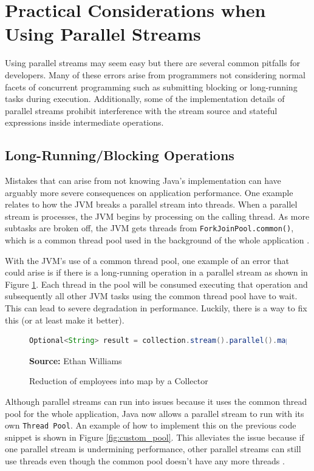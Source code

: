 \documentclass[oneside, 12pt]{article}
\newcommand{\source}[1]{\textbf{Source:} {#1} }
\begin{document}
\section{Practical Considerations when Using Parallel Streams}
Using parallel streams may seem easy but there are several common pitfalls for developers. Many of these errors arise from programmers not considering normal facets of concurrent programming such as submitting blocking or long-running tasks during execution. Additionally, some of the implementation details of parallel streams prohibit interference with the stream source and stateful expressions inside intermediate operations.

\subsection{Long-Running/Blocking Operations}
Mistakes that can arise from not knowing Java's implementation can have arguably more severe consequences on application performance. One example relates to how the JVM breaks a parallel stream into threads. When a parallel stream is processes, the JVM begins by processing on the calling thread. As more subtasks are broken off, the JVM gets threads from \verb|ForkJoinPool.common()|, which is a common thread pool used in the background of the whole application \autocite{dzone_dangers}. 

With the JVM's use of a common thread pool, one example of an error that could arise is if there is a long-running operation in a parallel stream as shown in Figure \ref{fig:network_op}. Each thread in the pool will be consumed executing that operation and subsequently all other JVM tasks using the common thread pool have to wait. This can lead to severe degradation in performance. Luckily, there is a way to fix this (or at least make it better).

\begin{figure}[H]
\centering
\begin{lstlisting}[language=Java]
Optional<String> result = collection.stream().parallel().map((base) -> longOperation(argument).findAny();
\end{lstlisting}
\caption{Reduction of employees into map by a Collector}
\source{Ethan Williams}
\label{fig:network_op}
\end{figure}

Although parallel streams can run into issues because it uses the common thread pool for the whole application, Java now allows a parallel stream to run with its own \verb|Thread Pool|. An example of how to implement this on the previous code snippet is shown in Figure \ref{fig:custom_pool}. This alleviates the issue because if one parallel stream is undermining performance, other parallel streams can still use threads even though the common pool doesn't have any more threads \autocite{dzone_fjp}.
\end{document}
